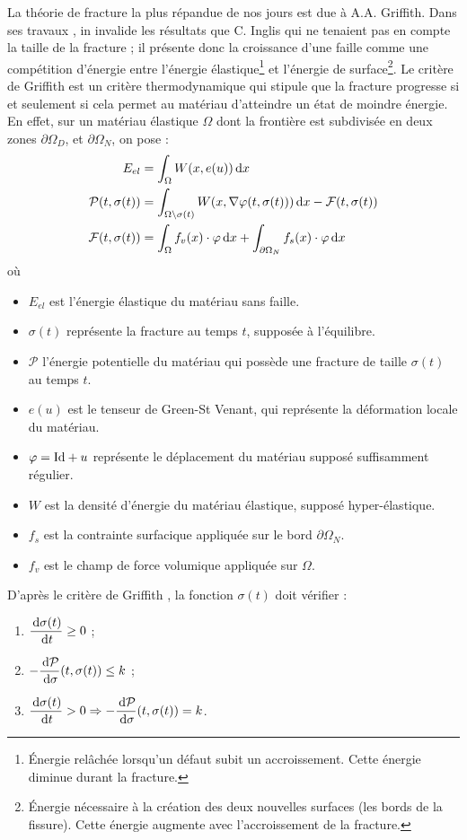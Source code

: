 La théorie de fracture la plus répandue de nos jours est due à A.A. Griffith. Dans ses travaux \parencite{griffith1921vi}, in invalide les résultats que C. Inglis \parencite{inglis1913stresses} qui ne tenaient pas en compte la taille de la fracture ; il présente donc la croissance d'une faille comme une compétition d'énergie entre l'énergie élastique\footnote{Énergie relâchée lorsqu’un défaut subit un accroissement. Cette énergie diminue durant la fracture.} et l'énergie de surface\footnote{Énergie nécessaire à la création des deux nouvelles surfaces (les bords de la fissure). Cette énergie augmente avec l'accroissement de la fracture.}. 
Le critère de Griffith est un critère thermodynamique qui stipule que la fracture progresse si et seulement si cela permet au matériau d’atteindre un état de moindre énergie. En effet, sur un matériau élastique $\Omega$ dont la frontière est subdivisée en deux zones $\partial \Omega_D$, et $\partial \Omega_N$, on pose \parencite[p.33]{balasoiu2020halthesis} :
\begin{align*}
    E_{el} &= \int_{\Omega} W (x, e(u)) \diff x     \\
    \mathcal{P}(t,\sigma(t)) &= \int_{\Omega \backslash \sigma(t) } W (x, \nabla\varphi (t, \sigma(t))) \diff x - \mathcal{F}(t,\sigma(t)) \\
    \mathcal{F}(t,\sigma(t)) &= \int_{\Omega} f_v (x)\cdot \varphi \diff x + \int_{\partial\Omega_N} f_s (x) \cdot \varphi \diff x
\end{align*}
où 
\begin{itemize}
    \item $E_{el}$ est l'énergie élastique du matériau sans faille.
    \item $\sigma(t)$ représente la fracture au temps $t$, supposée à l'équilibre.
    \item $\mathcal{P}$ l’énergie potentielle du matériau qui possède une fracture de taille $\sigma(t)$ au temps $t$.
    \item $e(u)$ est le tenseur de Green-St Venant, qui représente la déformation locale du matériau.
    \item $\varphi = \text{Id} + u$ représente le déplacement du matériau supposé suffisamment régulier.
    \item $W$ est la densité d’énergie du matériau élastique, supposé hyper-élastique.
    \item $f_s$ est la contrainte surfacique appliquée sur le bord $\partial \Omega_N$.
    \item $f_v$ est le champ de force volumique appliquée sur $\Omega$.
\end{itemize}
D'après le critère de Griffith \parencite[p.34]{balasoiu2020halthesis}, la fonction $\sigma(t)$ doit vérifier :
\begin{enumerate}
    \item $\dfrac{\diff \sigma(t)}{\diff t} \geq 0$ ;
    \item $-\dfrac{\diff \mathcal{P}}{\diff \sigma} (t,\sigma(t)) \leq k$ ;
    \item $\dfrac{\diff \sigma(t)}{\diff t} > 0 \Rightarrow -\dfrac{\diff \mathcal{P}}{\diff \sigma} (t,\sigma(t)) = k$.
\end{enumerate}

